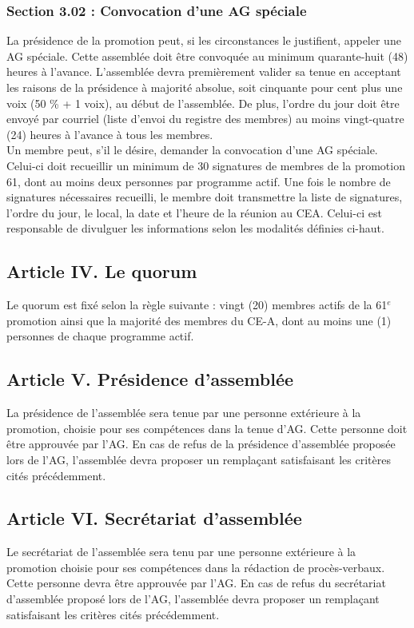 \subsubsection*{Section 3.02 : Convocation d'une AG spéciale}
La présidence de la promotion peut, si les circonstances le justifient, appeler une AG spéciale. Cette assemblée doit être convoquée au minimum quarante-huit (48) heures à l’avance. L’assemblée devra premièrement valider sa tenue en acceptant les raisons de la présidence à majorité absolue, soit cinquante pour cent plus une voix (50 \% + 1 voix), au début de l’assemblée. De plus, l’ordre du jour doit être envoyé par courriel (liste d’envoi du registre des membres) au moins vingt-quatre (24) heures à l’avance à tous les membres.
\\

Un membre peut, s’il le désire, demander la convocation d’une AG spéciale. Celui-ci doit recueillir un minimum de 30 signatures de membres de la promotion 61, dont au moins deux personnes par programme actif. Une fois le nombre de signatures nécessaires recueilli, le membre doit transmettre la liste de signatures, l’ordre du jour, le local, la date et l’heure de la réunion au CEA. Celui-ci est responsable de divulguer les informations selon les modalités définies ci-haut.

\subsection*{Article IV. Le quorum}
Le quorum est fixé selon la règle suivante : vingt (20) membres actifs de la 61$^e$ promotion ainsi que la majorité des membres du CE-A, dont au moins  une (1) personnes de chaque programme actif.

\subsection*{Article V. Présidence d'assemblée}
La présidence de l’assemblée sera tenue par une personne extérieure à la promotion, choisie pour ses compétences dans la tenue d’AG. Cette personne doit être approuvée par l’AG. En cas de refus de la présidence d’assemblée proposée lors de l’AG, l’assemblée devra proposer un remplaçant satisfaisant les critères cités précédemment.

\subsection*{Article VI. Secrétariat d'assemblée}
Le secrétariat de l’assemblée sera tenu par une personne extérieure à la promotion choisie pour ses compétences dans la rédaction de procès-verbaux. Cette personne devra être approuvée par l’AG. En cas de refus du secrétariat d’assemblée proposé lors de l’AG, l’assemblée devra proposer un remplaçant satisfaisant les critères cités précédemment.

